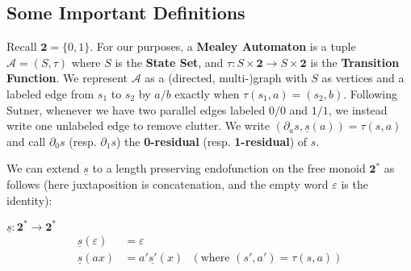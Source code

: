 \documentclass[runningheads]{llncs}
\newcommand{\A}{\mathcal{A}}
\newcommand{\2}{\textbf{2}}
\newcommand{\del}{\partial}
\begin{document}
\subsection{Some Important Definitions}

Recall $\2 = \{0,1\}$. For our purposes, a \textbf{Mealey Automaton} is a 
tuple $\A = (S, \tau)$ where $S$ is the \textbf{State Set}, and 
$\tau : S \times \2 \to S \times \2$ is the \textbf{Transition Function}. 
We represent $\A$ as a (directed, multi-)graph with $S$ as vertices and a 
labeled edge from $s_1$ to $s_2$ by $a/b$ exactly when $\tau(s_1,a) = (s_2,b)$.
Following Sutner, whenever we have two parallel edges labeled $0/0$ and $1/1$,
we instead write one unlabeled edge to remove clutter.
We write $(\del_a s, \underline{s}(a)) = \tau(s,a)$ and call $\del_0 s$ 
(resp. $\del_1 s$) the \textbf{0-residual} (resp. \textbf{1-residual}) of $s$.

We can extend $\underline{s}$ to a length preserving endofunction on the 
free monoid $\2^*$ as follows (here juxtaposition is concatenation, 
and the empty word $\varepsilon$ is the identity):

$\underline{s} : \2^* \to \2^*$
\begin{align*}
  \underline{s}(\varepsilon) &= \varepsilon\\
  \underline{s}(ax)       &= a' \underline{s'}(x) 
  ~~~(\text{where } (s', a') = \tau(s,a))
\end{align*}
\end{document}
